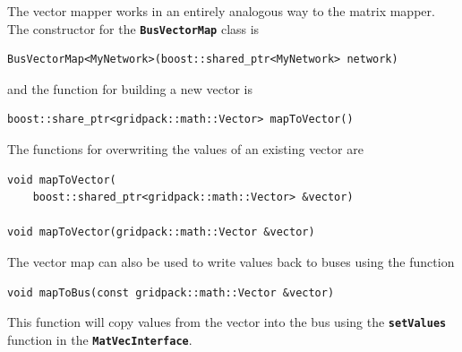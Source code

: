 The vector mapper works in an entirely analogous way to the matrix mapper. The constructor for the \texttt{\textbf{BusVectorMap}} class is

{
\color{red}
\begin{Verbatim}[fontseries=b]
BusVectorMap<MyNetwork>(boost::shared_ptr<MyNetwork> network)
\end{Verbatim}
}

and the function for building a new vector is

{
\color{red}
\begin{Verbatim}[fontseries=b]
boost::share_ptr<gridpack::math::Vector> mapToVector()
\end{Verbatim}
}

The functions for overwriting the values of an existing vector are

{
\color{red}
\begin{Verbatim}[fontseries=b]
void mapToVector(
    boost::shared_ptr<gridpack::math::Vector> &vector)

void mapToVector(gridpack::math::Vector &vector)
\end{Verbatim}
}

The vector map can also be used to write values back to buses using the function

{
\color{red}
\begin{Verbatim}[fontseries=b]
void mapToBus(const gridpack::math::Vector &vector)
\end{Verbatim}
}

This function will copy values from the vector into the bus using the \texttt{\textbf{setValues}} function in the \texttt{\textbf{MatVecInterface}}.
